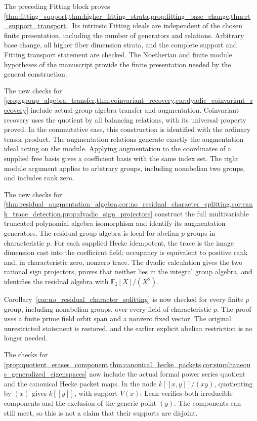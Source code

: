 \documentclass[11pt]{amsart}
\theoremstyle{definition}
\theoremstyle{remark}
\newcommand{\FF}{\mathbb F}
\begin{document}
The preceding Fitting block proves \cref{thm:fitting_support,thm:higher_fitting_strata,prop:fitting_base_change,thm:rt_support_transport}. Its intrinsic Fitting ideals are independent of the chosen finite presentation, including the number of generators and relations. Arbitrary base change, all higher fiber dimension strata, and the complete support and Fitting transport statement are checked. The Noetherian and finite module hypotheses of the manuscript provide the finite presentation needed by the general construction.

The new checks for \cref{prop:group_algebra_transfer,thm:coinvariant_recovery,cor:dyadic_coinvariant_recovery} include actual group algebra transfer and augmentation. Coinvariant recovery uses the quotient by all balancing relations, with its universal property proved. In the commutative case, this construction is identified with the ordinary tensor product. The augmentation relations generate exactly the augmentation ideal acting on the module. Applying augmentation to the coordinates of a supplied free basis gives a coefficient basis with the same index set. The right module argument applies to arbitrary groups, including nonabelian two groups, and includes rank zero.

The new checks for \cref{thm:residual_augmentation_algebra,cor:no_residual_character_splitting,cor:rank_trace_detection,prop:dyadic_sign_projectors} construct the full multivariable truncated polynomial algebra isomorphism and identify its augmentation generators. The residual group algebra is local for abelian \(p\) groups in characteristic \(p\). For each supplied Hecke idempotent, the trace is the image dimension cast into the coefficient field; occupancy is equivalent to positive rank and, in characteristic zero, nonzero trace. The dyadic calculation gives the two rational sign projectors, proves that neither lies in the integral group algebra, and identifies the residual algebra with \(\FF_2[X]/(X^2)\).

Corollary~\ref{cor:no_residual_character_splitting} is now checked for every finite \(p\) group, including nonabelian groups, over every field of characteristic \(p\). The proof uses a finite prime field orbit span and a nonzero fixed vector. The original unrestricted statement is restored, and the earlier explicit abelian restriction is no longer needed.

The checks for \cref{prop:quotient_erases_component,thm:canonical_hecke_packets,cor:simultaneous_generalized_eigenspaces} now include the actual formal power series quotient and the canonical Hecke packet maps. In the node \(k[[x,y]]/(xy)\), quotienting by \((x)\) gives \(k[[y]]\), with support \(V(x)\); Lean verifies both irreducible components and the exclusion of the generic point \((y)\). The components can still meet, so this is not a claim that their supports are disjoint.
\end{document}
